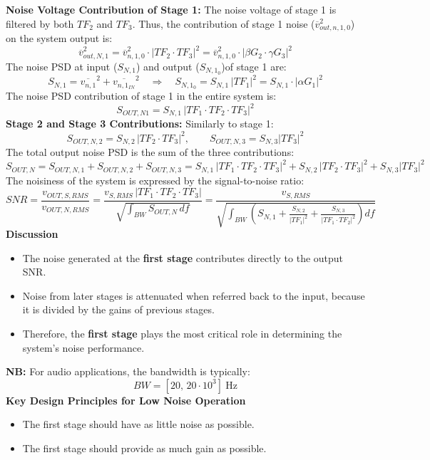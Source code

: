 \textbf{Noise Voltage Contribution of Stage 1: }
The noise voltage of stage 1 is filtered by both $TF_2$ and $TF_3$.  
Thus, the contribution of stage 1 noise ($\overline{v}_{out,n,1,0}^2$) on the system output is:
\[
\overline{v}_{out,N,1}^2 = \overline{v}_{n,1,0}^2 \cdot |TF_2 \cdot TF_3|^2 
= \overline{v}_{n,1,0}^2 \cdot |\beta G_2 \cdot \gamma G_3|^2
\]
The noise PSD at input ($S_{N,1}$) and output ($S_{N,1_0}$)of stage 1 are:
\[
S_{N,1} = \overline{v_{n,1}}^2 + \overline{v_{n,1_{IN}}}^2  
\quad \Rightarrow \quad
S_{N,1_0} = S_{N,1}\,|TF_1|^2 = S_{N,1} \cdot |\alpha G_1|^2
\]
The noise PSD contribution of stage 1 in the entire system is:
\[
S_{OUT,N1} = S_{N,1}\,|TF_1  \cdot TF_2 \cdot TF_3|^2
\]
\textbf{Stage 2 and Stage 3 Contributions: }
Similarly to stage 1:
\[
S_{OUT,N,2} = S_{N,2}\,|TF_2 \cdot TF_3|^2, 
\qquad
S_{OUT,N,3} = S_{N,3} \left| TF_3 \right|^2
\]
The total output noise PSD is the sum of the three contributions:
\[
S_{OUT,N} = S_{OUT,N,1} + S_{OUT,N,2} + S_{OUT,N,3}
= S_{N,1}\,|TF_1 \cdot TF_2 \cdot TF_3|^2 + S_{N,2}\,|TF_2 \cdot TF_3|^2 + S_{N,3}|TF_3|^2
\]
The noisiness of the system is expressed by the signal-to-noise ratio:
\[
SNR = \frac{v_{OUT,S,RMS}}{v_{OUT,N,RMS}}
= \frac{v_{S,RMS}\,|TF_1 \cdot TF_2 \cdot TF_3|}
{\sqrt{\int_{BW} S_{OUT,N}\,df}}
= \frac{v_{S,RMS}}{\sqrt{\int_{BW} \left(S_{N,1} + \frac{S_{N,2}}{|TF_1|^2} + \frac{S_{N,3}}{|TF_1 \cdot TF_2|^2}\right)df}}
\]
\textbf{Discussion}
\begin{itemize}
    \item The noise generated at the \textbf{first stage} contributes directly to the output SNR.  
    \item Noise from later stages is attenuated when referred back to the input, because it is divided by the gains of previous stages.  
    \item Therefore, the \textbf{first stage} plays the most critical role in determining the system’s noise performance.
\end{itemize}

\textbf{NB:} For audio applications, the bandwidth is typically:
\[
BW = [20, \, 20 \cdot 10^3] \ \text{Hz}
\]
\textbf{Key Design Principles for Low Noise Operation}
\begin{itemize}
    \item The first stage should have as little noise as possible.  
    \item The first stage should provide as much gain as possible.  
\end{itemize}

